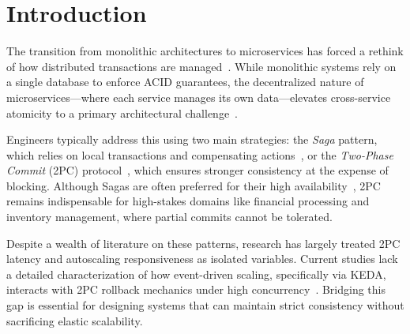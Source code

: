 \documentclass[]{USG}
\begin{document}


\maketitle



\section{Introduction}
\label{sec:introduction}

The transition from monolithic architectures to microservices has forced a rethink of how distributed transactions are managed~\cite{newman2021building}. 
%
While monolithic systems rely on a single database to enforce ACID guarantees, the decentralized nature of microservices---where each service manages its own data---elevates cross-service atomicity to a primary architectural challenge~\cite{larrucea2018microservices}.

Engineers typically address this using two main strategies: the \emph{Saga} pattern, which relies on local transactions and compensating actions~\cite{garcia1987sagas}, or the \emph{Two-Phase Commit} (2PC) protocol~\cite{gray1978notes}, which ensures stronger consistency at the expense of blocking. 
%
Although Sagas are often preferred for their high availability~\cite{helland2007life}, 2PC remains indispensable for high-stakes domains like financial processing and inventory management, where partial commits cannot be tolerated.

Despite a wealth of literature on these patterns, research has largely treated 2PC latency and autoscaling responsiveness as isolated variables. 
%
Current studies lack a detailed characterization of how event-driven scaling, specifically via KEDA, interacts with 2PC rollback mechanics under high concurrency~\cite{aral2018quality}. 
%
Bridging this gap is essential for designing systems that can maintain strict consistency without sacrificing elastic scalability.
\end{document}
